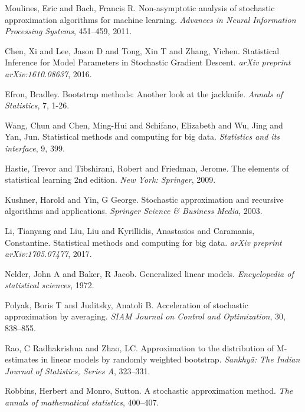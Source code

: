 \documentclass[twoside,11pt]{article}
\begin{document}
\vskip 0.2in
\begin{thebibliography}{99}
 {Moulines, Eric and Bach, Francis R}. Non-asymptotic analysis of stochastic approximation algorithms for machine learning. {\it Advances in Neural Information Processing Systems}, 451--459, 2011.

 {Chen, Xi and Lee, Jason D and Tong, Xin T and Zhang, Yichen}. Statistical Inference for Model Parameters in Stochastic Gradient Descent. {\it arXiv preprint arXiv:1610.08637}, 2016.

 {Efron, Bradley}. Bootstrap methods: Another look at the jackknife. {\it Annals of Statistics}, {7}, 1-26.

 {Wang, Chun and Chen, Ming-Hui and Schifano, Elizabeth and Wu, Jing and Yan, Jun}. Statistical methods and computing for big data. {\it Statistics and its interface}, {9}, 399.

 {Hastie, Trevor and Tibshirani, Robert and Friedman, Jerome}. The elements of statistical learning 2nd edition. {\it New York: Springer}, 2009.

 {Kushner, Harold and Yin, G George}. Stochastic approximation and recursive algorithms and applications. {\it Springer Science \& Business Media}, 2003.

 {Li, Tianyang and Liu, Liu and Kyrillidis, Anastasios and Caramanis, Constantine}. Statistical methods and computing for big data. {\it arXiv preprint arXiv:1705.07477}, 2017.

 {Nelder, John A and Baker, R Jacob}. Generalized linear models. {\it Encyclopedia of statistical sciences}, 1972.

 {Polyak, Boris T and Juditsky, Anatoli B}. Acceleration of stochastic approximation by averaging. {\it SIAM Journal on Control and Optimization}, {30}, 838--855.

 {Rao, C Radhakrishna and Zhao, LC}. Approximation to the distribution of M-estimates in linear models by randomly weighted bootstrap. {\it Sankhy{\=a}: The Indian Journal of Statistics, Series A}, 323--331.

 {Robbins, Herbert and Monro, Sutton}. A stochastic approximation method. {\it The annals of mathematical statistics}, 400--407.


\end{thebibliography}
\end{document}
